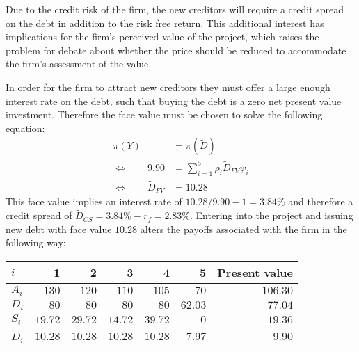 \documentclass[../main.tex]{subfiles}
\begin{document}
        Due to the credit risk of the firm, the new creditors will require a credit spread on the debt in addition to the risk free return. This additional interest has implications for the firm's perceived value of the project, which raises the problem for debate about whether the price should be reduced to accommodate the firm's assessment of the value.

        In order for the firm to attract new creditors they must offer a large enough interest rate on the debt, such that buying the debt is a zero net present value investment. Therefore the face value must be chosen to solve the following equation:
            \begin{align}
                \pi(Y) &= \pi(\tilde{D}) \\
                \Leftrightarrow  \qquad
                9.90 &= \sum_{i=1}^{5} \rho_{i}\tilde{D}_{FV}\psi_{i} \\
                \Leftrightarrow  \qquad
                \tilde{D}_{FV} &= 10.28
            \end{align}
        This face value implies an interest rate of $10.28 / 9.90 - 1 = 3.84\%$ and therefore a credit spread of $\tilde{D}_{CS} = 3.84\% - r_{f} = 2.83\%$. Entering into the project and issuing new debt with face value $10.28$ alters the payoffs associated with the firm in the following way:
        \begin{table}[H]
            \centering
            \begin{tabular}{l|rrrrr||r}
                $i$ & 1 & 2 & 3 & 4 & 5 & Present value \\
                \hline
                $A_{i}$ & $130$ & $120$ & $110$ & $105$ & $70$ & $106.30$ \\
                $D_{i}$ & $80$ & $80$ & $80$ & $80$ & $62.03$ & $77.04$ \\
                $S_{i}$ & $19.72$ & $29.72$ & $14.72$ & $39.72$ & $0$ & $19.36$ \\
                $\tilde{D}_{i}$ & $10.28$ & $10.28$ & $10.28$ & $10.28$ & $7.97$ & $9.90$ \\
            \end{tabular}
        \end{table}
\end{document}
